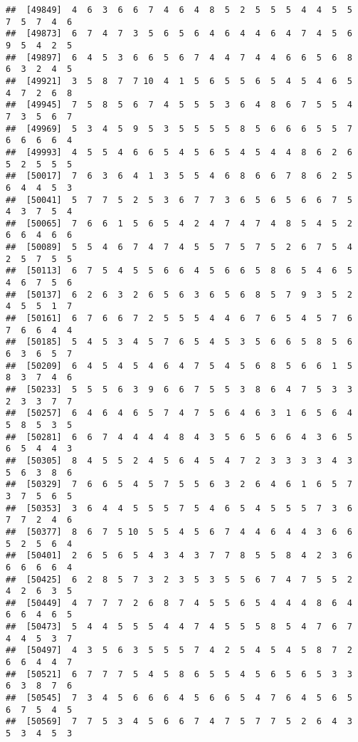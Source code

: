 \documentclass[
]{book}
\begin{document}
\begin{verbatim}
##  [49849]  4  6  3  6  6  7  4  6  4  8  5  2  5  5  5  4  4  5  5  7  5  7  4  6
##  [49873]  6  7  4  7  3  5  6  5  6  4  6  4  4  6  4  7  4  5  6  9  5  4  2  5
##  [49897]  6  4  5  3  6  6  5  6  7  4  4  7  4  4  6  6  5  6  8  6  3  2  4  5
##  [49921]  3  5  8  7  7 10  4  1  5  6  5  5  6  5  4  5  4  6  5  4  7  2  6  8
##  [49945]  7  5  8  5  6  7  4  5  5  5  3  6  4  8  6  7  5  5  4  7  3  5  6  7
##  [49969]  5  3  4  5  9  5  3  5  5  5  5  8  5  6  6  6  5  5  7  6  6  6  6  4
##  [49993]  4  5  5  4  6  6  5  4  5  6  5  4  5  4  4  8  6  2  6  5  2  5  5  5
##  [50017]  7  6  3  6  4  1  3  5  5  4  6  8  6  6  7  8  6  2  5  6  4  4  5  3
##  [50041]  5  7  7  5  2  5  3  6  7  7  3  6  5  6  5  6  6  7  5  4  3  7  5  4
##  [50065]  7  6  6  1  5  6  5  4  2  4  7  4  7  4  8  5  4  5  2  6  6  4  6  6
##  [50089]  5  5  4  6  7  4  7  4  5  5  7  5  7  5  2  6  7  5  4  2  5  7  5  5
##  [50113]  6  7  5  4  5  5  6  6  4  5  6  6  5  8  6  5  4  6  5  4  6  7  5  6
##  [50137]  6  2  6  3  2  6  5  6  3  6  5  6  8  5  7  9  3  5  2  4  5  5  1  7
##  [50161]  6  7  6  6  7  2  5  5  5  4  4  6  7  6  5  4  5  7  6  7  6  6  4  4
##  [50185]  5  4  5  3  4  5  7  6  5  4  5  3  5  6  6  5  8  5  6  6  3  6  5  7
##  [50209]  6  4  5  4  5  4  6  4  7  5  4  5  6  8  5  6  6  1  5  8  3  7  4  6
##  [50233]  5  5  5  6  3  9  6  6  7  5  5  3  8  6  4  7  5  3  3  2  3  3  7  7
##  [50257]  6  4  6  4  6  5  7  4  7  5  6  4  6  3  1  6  5  6  4  5  8  5  3  5
##  [50281]  6  6  7  4  4  4  4  8  4  3  5  6  5  6  6  4  3  6  5  6  5  4  4  3
##  [50305]  8  4  5  5  2  4  5  6  4  5  4  7  2  3  3  3  3  4  3  5  6  3  8  6
##  [50329]  7  6  6  5  4  5  7  5  5  6  3  2  6  4  6  1  6  5  7  3  7  5  6  5
##  [50353]  3  6  4  4  5  5  5  7  5  4  6  5  4  5  5  5  7  3  6  7  7  2  4  6
##  [50377]  8  6  7  5 10  5  5  4  5  6  7  4  4  6  4  4  3  6  6  5  2  5  6  4
##  [50401]  2  6  5  6  5  4  3  4  3  7  7  8  5  5  8  4  2  3  6  6  6  6  6  4
##  [50425]  6  2  8  5  7  3  2  3  5  3  5  5  6  7  4  7  5  5  2  4  2  6  3  5
##  [50449]  4  7  7  7  2  6  8  7  4  5  5  6  5  4  4  4  8  6  4  6  6  4  6  5
##  [50473]  5  4  4  5  5  5  4  4  7  4  5  5  5  8  5  4  7  6  7  4  4  5  3  7
##  [50497]  4  3  5  6  3  5  5  5  7  4  2  5  4  5  4  5  8  7  2  6  6  4  4  7
##  [50521]  6  7  7  7  5  4  5  8  6  5  5  4  5  6  5  6  5  3  3  6  3  8  7  6
##  [50545]  7  3  4  5  6  6  6  4  5  6  6  5  4  7  6  4  5  6  5  6  7  5  4  5
##  [50569]  7  7  5  3  4  5  6  6  7  4  7  5  7  7  5  2  6  4  3  5  3  4  5  3

\end{verbatim}
\end{document}
